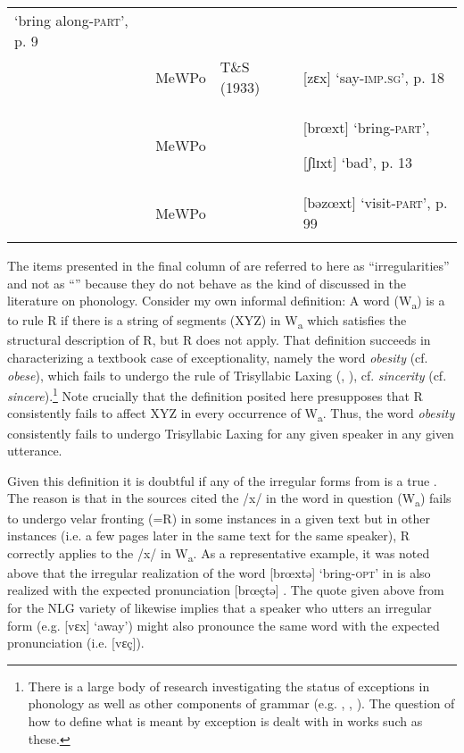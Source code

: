 \begin{table}
\begin{tabularx}{\textwidth}{lllQ}
‘bring along-\textsc{part}’, p. 9\\
 & MeWPo & T\&S (1933) & [zɛx] ‘say-\textsc{imp}.\textsc{sg}’, p. 18\\
 & MeWPo & \citet{Teuchert1934} & [brœxt] ‘bring-\textsc{part}’,

[ʃlɪxt] ‘bad’, p. 13\\
 & MeWPo & \citet{Schönfeld1989} & [bəzœxt] ‘visit-\textsc{part}’, p. 99\\
\lspbottomrule
\end{tabularx}
\end{table}

The items presented in the final column of  are referred to here as “irregularities” and not as “” because they do not behave as the kind of  discussed in the literature on phonology. Consider my own informal definition: A word (W\textsubscript{a}) is a  to rule R if there is a string of segments (XYZ) in W\textsubscript{a} which satisfies the structural description of R, but R does not apply. That definition succeeds in characterizing a textbook case of exceptionality, namely the word \textit{obesity} (cf. \textit{obese}), which fails to undergo the  rule of Trisyllabic Laxing (, ), cf. \textit{sincerity} (cf. \textit{sincere}).\footnote{{There is a large body of research investigating the status of exceptions in phonology as well as other components of grammar (e.g. \citealt{Zonneveld1978}, \citealt{Wolf2011}, \citealt{SimonWiese2011}). The question of how to define what is meant by exception is dealt with in works such as these.}} Note crucially that the definition posited here presupposes that R consistently fails to affect XYZ in every occurrence of W\textsubscript{a}. Thus, the word \textit{obesity} consistently fails to undergo Trisyllabic Laxing for any given speaker in any given utterance.


Given this definition it is doubtful if any of the irregular forms from  is a true . The reason is that in the sources cited the /x/ in the word in question (W\textsubscript{a}) fails to undergo velar fronting (=R) in some instances in a given text but in other instances (i.e. a few pages later in the same text for the same speaker), R correctly applies to the /x/ in W\textsubscript{a}. As a representative example, it was noted above that the irregular realization of the word [brœxtə] ‘bring\textsc{{}-opt}’ in  is also realized with the expected pronunciation [brœçtə] \citep{Wix1921}. The quote given above from \citet[23]{Kloeke1914} for the NLG variety of  likewise implies that a speaker who utters an irregular form (e.g. [vɛx] ‘away’) might also pronounce the same word with the expected pronunciation (i.e. [vɛç]).

